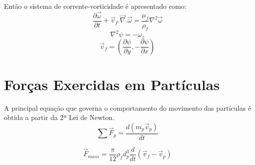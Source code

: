 Então o sistema de corrente-vorticidade é apresentado como:
\begin{equation}
	\dfrac{\partial \vec{\omega}}{\partial t} +
	\vec{v}_f.\vec{\nabla}.\vec{\omega} =
    \dfrac{\mu_f}{\rho_f} \nabla^2 \vec{\omega}
    \label{fluid_eq1}
\end{equation}
\begin{equation}
	\nabla^2\psi =
	-\omega_z
    \label{fluid_eq2}
\end{equation}
\begin{equation}
	\vec{v}_f = \left(\dfrac{\partial \psi}{\partial y},
	-\dfrac{\partial \psi}{\partial x} \right)
    \label{fluid_eq3}
\end{equation}


\section{\textbf{Forças Exercidas em Partículas}}
\label{sec_eq_part}
A principal equação que governa o comportamento do movimento das partículas é obtida a partir da 2ª Lei de Newton\cite{crowe}.
\begin{equation}
    \sum\vec{F}_{p} = \dfrac{d(m_p\vec{v}_p)}{dt}
    \label{newton} 
\end{equation}


\begin{equation}
    \vec{F}_{mass} = \dfrac{\pi}{12} \rho_{f} d_{p}^3 \dfrac{d}{dt} \left(\vec{v}_{f} - \vec{v}_{p} \right) 
    \label{added_mass} 
\end{equation}